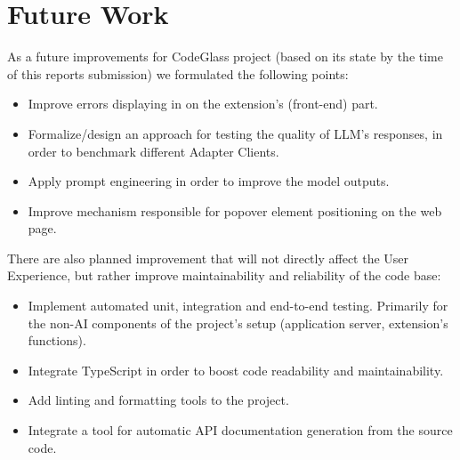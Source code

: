 \section{Future Work}

As a future improvements for CodeGlass project (based on its state by the time
of this reports submission) we formulated the following points:

\begin{itemize}
    \item Improve errors displaying in on the extension's (front-end) part.
    \item Formalize/design an approach for testing the quality of LLM's responses,
        in order to benchmark different Adapter Clients.
    \item Apply prompt engineering in order to improve the model outputs.
    \item Improve mechanism responsible for popover element positioning on the
        web page.
\end{itemize}

There are also planned improvement that will not directly affect the User Experience,
but rather improve maintainability and reliability of the code base:

\begin{itemize}
    \item Implement automated unit, integration and end-to-end testing. Primarily
        for the non-AI components of the project's setup (application server,
        extension's functions).
    \item Integrate TypeScript in order to boost code readability and
        maintainability.
    \item Add linting and formatting tools to the project.
    \item Integrate a tool for automatic API documentation generation from the
        source code.
\end{itemize}
